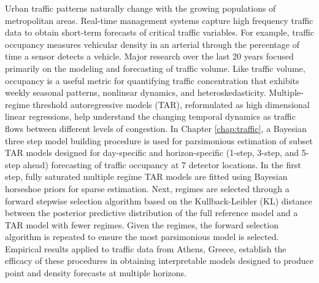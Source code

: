 Urban traffic patterns naturally change with the growing populations of metropolitan areas. Real-time management systems capture high frequency traffic data to obtain short-term forecasts of critical traffic variables.  For example, traffic occupancy measures vehicular density in an arterial through the percentage of time a sensor detects a vehicle. Major research over the last 20 years focused primarily on the modeling and forecasting of traffic volume. Like traffic volume,  occupancy is a useful metric for quantifying traffic concentration that exhibits weekly seasonal patterns, nonlinear dynamics, and heteroskedasticity. Multiple-regime threshold autoregressive models (TAR), reformulated as high dimensional linear regressions, help understand the changing temporal dynamics as traffic flows between different levels of congestion. In Chapter \ref{chap:traffic}, a Bayesian three step model building procedure is used for parsimonious estimation of subset TAR models designed for day-specific and horizon-specific (1-step, 3-step, and 5-step ahead) forecasting of traffic occupancy at 7 detector locations. In the first step, fully saturated multiple regime TAR models are fitted using Bayesian horseshoe priors for sparse estimation. Next, regimes are selected through a forward stepwise selection algorithm based on the Kullback-Leibler (KL) distance between the posterior predictive distribution of the full reference model and a TAR model with fewer regimes. Given the regimes, the forward selection algorithm is repeated to ensure the most parsimonious model is selected. Empirical results applied to traffic data from Athens, Greece, establish the efficacy of these procedures in obtaining interpretable models designed to produce point and density forecasts at multiple horizons.

